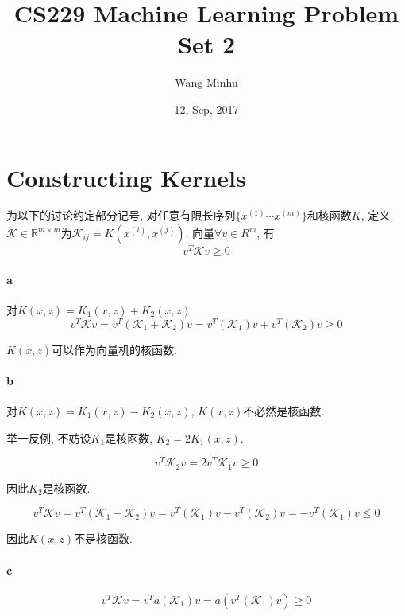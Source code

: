 \documentclass{ctexart}
\begin{document}
		\title{CS229 Machine Learning Problem Set 2}
		\author{Wang Minhu}
		\date{12, Sep, 2017}
		\maketitle
		\clearpage
\section{Constructing Kernels}
为以下的讨论约定部分记号, 对任意有限长序列$\{x^{(1)} \cdots x^{(m)}\}$和核函数$K$, 定义$\mathcal{K} \in {\mathbb{R}}^{m \times m}$为${\mathcal{K}}_{ij} = K(x^{(i)}, x^{(j)})$.
向量$\forall v \in R^m$, 有
\begin{equation*}
	v^T \mathcal{K} v \ge 0
\end{equation*}
\paragraph{a}
	对$K(x,z) = K_1(x,z) + K_2(x,z)$
\begin{equation*}
	v^T \mathcal{K} v = v^T (\mathcal{K}_1 + \mathcal{K}_2) v = v^T (\mathcal{K}_1 ) v +  v^T (\mathcal{K}_2) v \ge 0
\end{equation*}

	$K(x,z)$可以作为向量机的核函数.
	
\paragraph{b}
	对$K(x,z) = K_1(x,z) - K_2(x,z)$, $K(x,z)$不必然是核函数.
	
	举一反例, 不妨设$K_1$是核函数, $K_2 = 2K_1(x,z)$.

\begin{equation*}
	v^T \mathcal{K}_2 v = 2	v^T \mathcal{K}_1 v \ge 0
\end{equation*}	

	因此$K_2$是核函数.
	
\begin{equation*}
v^T \mathcal{K} v = v^T (\mathcal{K}_1 - \mathcal{K}_2) v = v^T (\mathcal{K}_1 ) v -  v^T (\mathcal{K}_2) v = - v^T (\mathcal{K}_1) v \le 0
\end{equation*}	
	
	因此$K(x,z)$不是核函数.
	
\paragraph{c}

\begin{equation*}
v^T \mathcal{K} v = v^T a(\mathcal{K}_1) v = a(v^T (\mathcal{K}_1 ) v) \ge 0
\end{equation*}		
	
\end{document}

